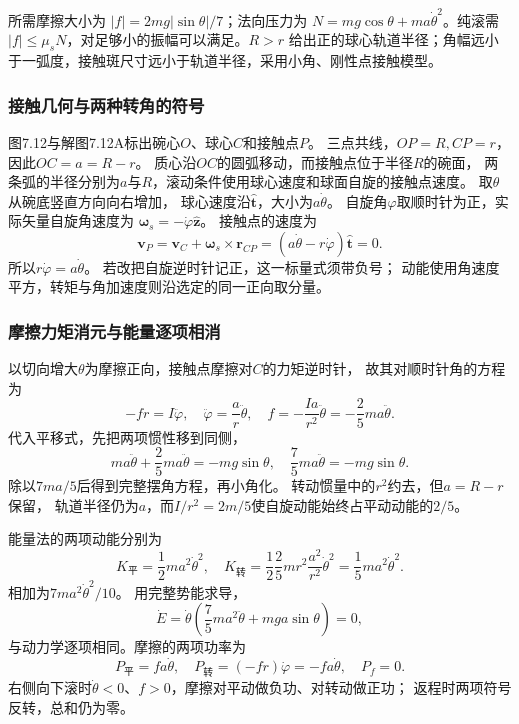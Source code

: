 \documentclass[UTF8,fontset=fandol,a4paper,11pt]{ctexart}
\begin{document}
所需摩擦大小为 $|f|=2mg|\sin\theta|/7$；法向压力为 $N=mg\cos\theta+ma\dot\theta^2$。纯滚需 $|f|\le\mu_sN$，对足够小的振幅可以满足。$R>r$ 给出正的球心轨道半径；角幅远小于一弧度，接触斑尺寸远小于轨道半径，采用小角、刚性点接触模型。
\subsubsection*{接触几何与两种转角的符号}
图7.12与解图7.12A标出碗心$O$、球心$C$和接触点$P$。
三点共线，$OP=R,CP=r$，因此$OC=a=R-r$。
质心沿$OC$的圆弧移动，而接触点位于半径$R$的碗面，
两条弧的半径分别为$a$与$R$，滚动条件使用球心速度和球面自旋的接触点速度。
取$\theta$从碗底竖直方向向右增加，
球心速度沿$\hat{\boldsymbol t}$，大小为$a\dot\theta$。
自旋角$\varphi$取顺时针为正，实际矢量自旋角速度为
$\boldsymbol\omega_s=-\dot\varphi\hat{\boldsymbol z}$。
接触点的速度为
\[
\boldsymbol v_P=\boldsymbol v_C+\boldsymbol\omega_s\times\boldsymbol r_{CP}
=(a\dot\theta-r\dot\varphi)\hat{\boldsymbol t}=0.
\]
所以$r\dot\varphi=a\dot\theta$。
若改把自旋逆时针记正，这一标量式须带负号；
动能使用角速度平方，转矩与角加速度则沿选定的同一正向取分量。

\subsubsection*{摩擦力矩消元与能量逐项相消}
以切向增大$\theta$为摩擦正向，接触点摩擦对$C$的力矩逆时针，
故其对顺时针角的方程为
\[
-fr=I\ddot\varphi,\quad
\ddot\varphi=\frac ar\ddot\theta,\quad
f=-\frac{Ia}{r^2}\ddot\theta=-\frac25ma\ddot\theta.
\]
代入平移式，先把两项惯性移到同侧，
\[
ma\ddot\theta+\frac25ma\ddot\theta=-mg\sin\theta,
\quad\frac75ma\ddot\theta=-mg\sin\theta.
\]
除以$7ma/5$后得到完整摆角方程，再小角化。
转动惯量中的$r^2$约去，但$a=R-r$保留，
轨道半径仍为$a$，而$I/r^2=2m/5$使自旋动能始终占平动动能的$2/5$。

能量法的两项动能分别为
\[
K_{\text{平}}=\frac12ma^2\dot\theta^2,
\quad K_{\text{转}}=\frac12\frac25mr^2
\frac{a^2}{r^2}\dot\theta^2=\frac15ma^2\dot\theta^2.
\]
相加为$7ma^2\dot\theta^2/10$。
用完整势能求导，
\[
\dot E=\dot\theta\left(\frac75ma^2\ddot\theta+mga\sin\theta\right)=0,
\]
与动力学逐项相同。摩擦的两项功率为
\[
P_{\text{平}}=fa\dot\theta,\quad
P_{\text{转}}=(-fr)\dot\varphi=-fa\dot\theta,
\quad P_f=0.
\]
右侧向下滚时$\dot\theta<0$、$f>0$，摩擦对平动做负功、对转动做正功；
返程时两项符号反转，总和仍为零。
\end{document}
